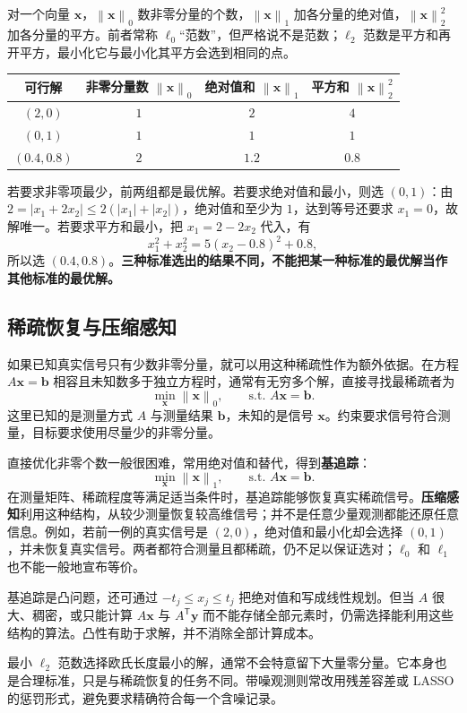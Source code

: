 \documentclass[UTF8,fontset=fandol,a4paper,12pt]{ctexart}
\newcommand{\vx}{\boldsymbol x}
\newcommand{\vb}{\boldsymbol b}
\newcommand{\norm}[1]{\left\lVert#1\right\rVert}
\theoremstyle{definition}
\begin{document}
对一个向量 $\vx$，$\norm{\vx}_0$ 数非零分量的个数，$\norm{\vx}_1$ 加各分量的绝对值，$\norm{\vx}_2^2$ 加各分量的平方。前者常称 $\ell_0$“范数”，但严格说不是范数；$\ell_2$ 范数是平方和再开平方，最小化它与最小化其平方会选到相同的点。
\begin{center}
\begin{tabular}{cccc}
\toprule
可行解 & 非零分量数 $\norm{\vx}_0$ & 绝对值和 $\norm{\vx}_1$ & 平方和 $\norm{\vx}_2^2$\\
\midrule
$(2,0)$ & $1$ & $2$ & $4$\\
$(0,1)$ & $1$ & $1$ & $1$\\
$(0.4,0.8)$ & $2$ & $1.2$ & $0.8$\\
\bottomrule
\end{tabular}
\end{center}
若要求非零项最少，前两组都是最优解。若要求绝对值和最小，则选 $(0,1)$：由 $2=|x_1+2x_2|\le2(|x_1|+|x_2|)$，绝对值和至少为 $1$，达到等号还要求 $x_1=0$，故解唯一。若要求平方和最小，把 $x_1=2-2x_2$ 代入，有
\[
 x_1^2+x_2^2=5(x_2-0.8)^2+0.8,
\]
所以选 $(0.4,0.8)$。\textbf{三种标准选出的结果不同，不能把某一种标准的最优解当作其他标准的最优解。}

\subsection{稀疏恢复与压缩感知}
如果已知真实信号只有少数非零分量，就可以用这种稀疏性作为额外依据。在方程 $A\vx=\vb$ 相容且未知数多于独立方程时，通常有无穷多个解，直接寻找最稀疏者为
\[
 \min_{\vx}\norm{\vx}_0,\qquad\text{s.t. }A\vx=\vb.
\]
这里已知的是测量方式 $A$ 与测量结果 $\vb$，未知的是信号 $\vx$。约束要求信号符合测量，目标要求使用尽量少的非零分量。

直接优化非零个数一般很困难，常用绝对值和替代，得到\textbf{基追踪}：
\[
 \boxed{\min_{\vx}\norm{\vx}_1,\qquad\text{s.t. }A\vx=\vb.}
\]
在测量矩阵、稀疏程度等满足适当条件时，基追踪能够恢复真实稀疏信号。\textbf{压缩感知}利用这种结构，从较少测量恢复较高维信号；并不是任意少量观测都能还原任意信息。例如，若前一例的真实信号是 $(2,0)$，绝对值和最小化却会选择 $(0,1)$，并未恢复真实信号。两者都符合测量且都稀疏，仍不足以保证选对；$\ell_0$ 和 $\ell_1$ 也不能一般地宣布等价。

基追踪是凸问题，还可通过 $-t_j\le x_j\le t_j$ 把绝对值和写成线性规划。但当 $A$ 很大、稠密，或只能计算 $A\vx$ 与 $A^{\mathsf T}\boldsymbol y$ 而不能存储全部元素时，仍需选择能利用这些结构的算法。凸性有助于求解，并不消除全部计算成本。

最小 $\ell_2$ 范数选择欧氏长度最小的解，通常不会特意留下大量零分量。它本身也是合理标准，只是与稀疏恢复的任务不同。带噪观测则常改用残差容差或 LASSO 的惩罚形式，避免要求精确符合每一个含噪记录。
\end{document}
